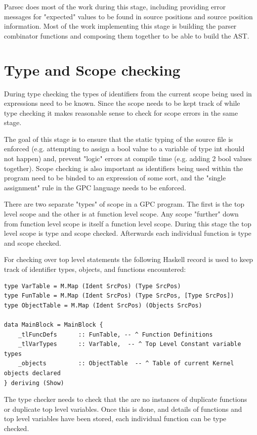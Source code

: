 Parsec does most of the work during this stage, including
providing error messages for "expected" values to be found in source
positions and source position information. Most of the work implementing
this stage is building the parser combinator functions and composing
them together to be able to build the AST.


\section{Type and Scope checking}
\label{sec:type}
During type checking the types of identifiers from the current scope being used in expressions need
to be known. Since the scope needs to be kept track of while type checking it makes reasonable
sense to check for scope errors in the same stage.

The goal of this stage is to ensure that the static typing of the source file
is enforced (e.g. attempting to assign a bool value to a variable of type int should not happen) and,
prevent "logic" errors at compile time (e.g. adding 2 bool values together). Scope checking
is also important as identifiers being used within the program need to be binded to an expression of
some sort, and the "single assignment" rule in the GPC language needs to be enforced.

There are two separate "types" of scope in a GPC program. The first is the top level scope and the
other is at function level scope. Any scope "further" down from function level scope is itself
a function level scope. During this stage the top level scope is type and scope checked.
Afterwards each individual function is type and scope checked.

For checking over top level statements the following Haskell record is used
to keep track of identifier types, objects, and functions encountered:

\begin{lstlisting}[style=myHaskell]
type VarTable = M.Map (Ident SrcPos) (Type SrcPos)
type FunTable = M.Map (Ident SrcPos) (Type SrcPos, [Type SrcPos])
type ObjectTable = M.Map (Ident SrcPos) (Objects SrcPos)

data MainBlock = MainBlock {
    _tlFuncDefs      :: FunTable, -- ^ Function Definitions
    _tlVarTypes      :: VarTable,  -- ^ Top Level Constant variable types
    _objects         :: ObjectTable  -- ^ Table of current Kernel objects declared 
} deriving (Show)
\end{lstlisting}

The type checker needs to check that the are no instances of duplicate functions or 
duplicate top level variables. Once this is done, and details of functions and top level
variables have been stored, each individual function can be type checked.

